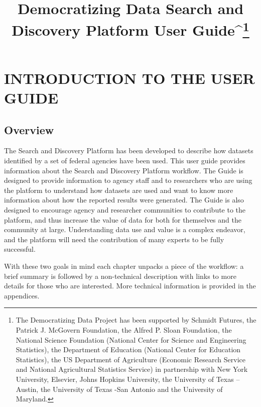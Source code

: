\documentclass[titlepage, 11pt]{article}
\title{{\fontfamily{qtm}\selectfont
\Huge{Democratizing Data Search and
Discovery Platform User Guide}^\large{\footnote{The Democratizing Data Project has been supported by Schmidt Futures, the Patrick J. McGovern Foundation, the Alfred P. Sloan Foundation, the National Science Foundation (National Center for Science and Engineering Statistics), the Department of Education (National Center for Education Statistics), the US Department of Agriculture (Economic Research Service and National Agricultural Statistics Service) in partnership with New York University, Elsevier, Johns Hopkins University, the University of Texas – Austin, the University of Texas -San Antonio and the University of Maryland. }}
} }
\begin{document}
\maketitle
\tableofcontents

\newpage

\section{INTRODUCTION TO THE USER GUIDE} 
\subsection{Overview}
The Search and Discovery Platform has been developed to describe how datasets identified by a set of federal agencies have been used. This user guide provides information about the Search and Discovery Platform workflow.  The Guide is designed to provide information to agency staff and to researchers who are using the platform to understand how datasets are used and want to know more information about how the reported results were generated. The Guide is also designed to encourage agency and researcher communities to contribute to the platform, and thus increase the value of data for both for themselves and the community at large. Understanding data use and value is a complex endeavor, and the platform will need the contribution of many experts to be fully successful. 

With these two goals in mind each chapter unpacks a piece of the workflow: a brief summary is followed by a non-technical description with links to more details for those who are interested.  More technical information is provided in the appendices. 
\end{document}
